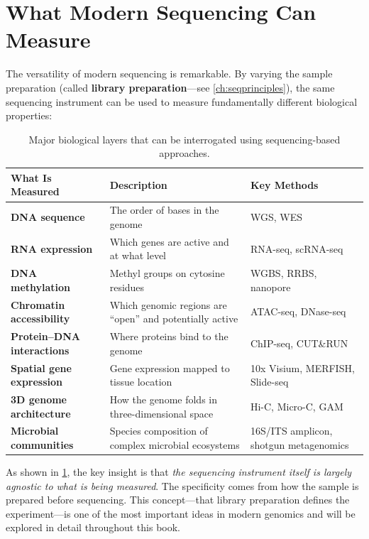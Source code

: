 \section{What Modern Sequencing Can Measure}
\label{sec:intro:what-sequencing-measures}

The versatility of modern sequencing is remarkable. By varying the sample preparation (called \textbf{library preparation}---see \cref{ch:seqprinciples}), the same sequencing instrument can be used to measure fundamentally different biological properties:

\begin{table}[htbp]
\centering
\caption[Biological layers measurable by sequencing.]{Major biological layers that can be interrogated using sequencing-based approaches.}
\label{tab:intro:measurement-types}
\small
\begin{tabularx}{\textwidth}{>{\bfseries}l X l}
\toprule
\textbf{What Is Measured} & \textbf{Description} & \textbf{Key Methods} \\
\midrule
DNA sequence & The order of bases in the genome & \acrshort{WGS}, \acrshort{WES} \\
\addlinespace
RNA expression & Which genes are active and at what level & \acrshort{RNA-seq}, \acrshort{scRNA-seq} \\
\addlinespace
DNA methylation & Methyl groups on cytosine residues & \acrshort{WGBS}, RRBS, nanopore \\
\addlinespace
Chromatin accessibility & Which genomic regions are ``open'' and potentially active & \acrshort{ATAC-seq}, DNase-seq \\
\addlinespace
Protein--DNA interactions & Where proteins bind to the genome & \acrshort{ChIP-seq}, CUT\&RUN \\
\addlinespace
Spatial gene expression & Gene expression mapped to tissue location & 10x Visium, MERFISH, Slide-seq \\
\addlinespace
3D genome architecture & How the genome folds in three-dimensional space & \acrshort{Hi-C}, Micro-C, GAM \\
\addlinespace
Microbial communities & Species composition of complex microbial ecosystems & 16S/ITS amplicon, shotgun metagenomics \\
\bottomrule
\end{tabularx}
\end{table}

As shown in \cref{tab:intro:measurement-types}, the key insight is that \textit{the sequencing instrument itself is largely agnostic to what is being measured}. The specificity comes from how the sample is prepared before sequencing. This concept---that library preparation defines the experiment---is one of the most important ideas in modern genomics and will be explored in detail throughout this book.

